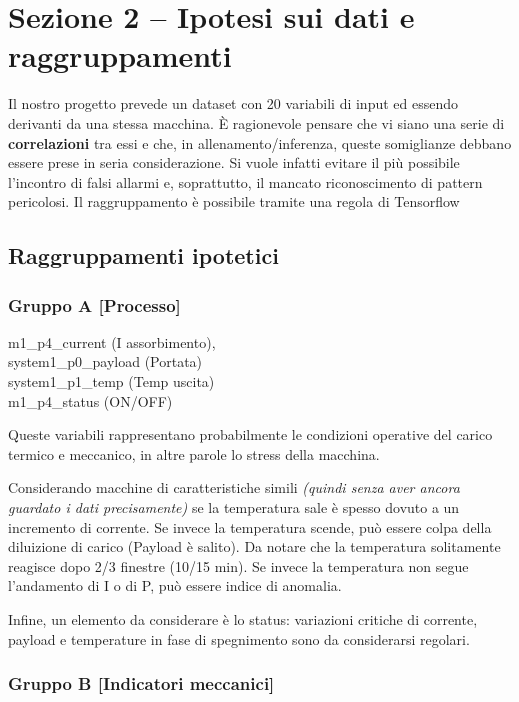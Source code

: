 \section{Sezione 2 -- Ipotesi sui dati e raggruppamenti}

Il nostro progetto prevede un dataset con 20 variabili di input ed essendo derivanti da una stessa macchina. È ragionevole pensare che vi siano una serie di \textbf{correlazioni} tra essi e che, in allenamento/inferenza, queste somiglianze debbano essere prese in seria considerazione. Si vuole infatti evitare il più possibile l’incontro di falsi allarmi e, soprattutto, il mancato riconoscimento di pattern pericolosi. Il raggruppamento è possibile tramite una regola di Tensorflow

\subsection{Raggruppamenti ipotetici}

\subsubsection{Gruppo A [Processo]}

m1\_p4\_current (I assorbimento),\\
system1\_p0\_payload (Portata)\\
system1\_p1\_temp (Temp uscita)\\
m1\_p4\_status (ON/OFF)

Queste variabili rappresentano probabilmente le condizioni operative del carico termico e meccanico, in altre parole lo stress della macchina. 

Considerando macchine di caratteristiche simili \textit{(quindi senza aver ancora guardato i dati precisamente)} se la temperatura sale è spesso dovuto a un incremento di corrente. Se invece la temperatura scende, può essere colpa della diluizione di carico (Payload è salito). Da notare che la temperatura solitamente reagisce dopo 2/3 finestre (10/15 min). Se invece la temperatura non segue l’andamento di I o di P, può essere indice di anomalia.

Infine, un elemento da considerare è lo status: variazioni critiche di corrente, payload e temperature in fase di spegnimento sono da considerarsi regolari.

\subsubsection{Gruppo B [Indicatori meccanici]}

